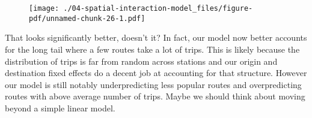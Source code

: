 \documentclass[
  letterpaper,
  krantz2]{style/krantz}
\newenvironment{Shaded}{\begin{snugshade}}{\end{snugshade}}
\newcommand{\AttributeTok}[1]{\textcolor[rgb]{0.40,0.45,0.13}{#1}}
\newcommand{\DecValTok}[1]{\textcolor[rgb]{0.68,0.00,0.00}{#1}}
\newcommand{\FunctionTok}[1]{\textcolor[rgb]{0.28,0.35,0.67}{#1}}
\newcommand{\NormalTok}[1]{\textcolor[rgb]{0.00,0.23,0.31}{#1}}
\newcommand{\SpecialCharTok}[1]{\textcolor[rgb]{0.37,0.37,0.37}{#1}}
\newcommand{\StringTok}[1]{\textcolor[rgb]{0.13,0.47,0.30}{#1}}
\begin{document}
\begin{Shaded}
\end{Shaded}

\begin{figure}[H]

{\centering \texttt{[image: ./04-spatial-interaction-model\_files/figure-pdf/unnamed-chunk-26-1.pdf]}

}

\end{figure}

That looks significantly better, doesn't it? In fact, our model now
better accounts for the long tail where a few routes take a lot of
trips. This is likely because the distribution of trips is far from
random across stations and our origin and destination fixed effects do a
decent job at accounting for that structure. However our model is still
notably underpredicting less popular routes and overpredicting routes
with above average number of trips. Maybe we should think about moving
beyond a simple linear model.
\end{document}
